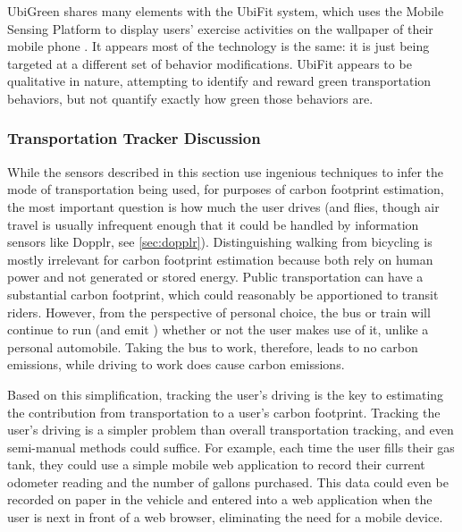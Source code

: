 UbiGreen shares many elements with the UbiFit system, which uses the Mobile Sensing Platform to display users' exercise activities on the wallpaper of their mobile phone \cite{Consolvo2008Flowers-or-robot}. It appears most of the technology is the same: it is just being targeted at a different set of behavior modifications. UbiFit appears to be qualitative in nature, attempting to identify and reward green transportation behaviors, but not quantify exactly how green those behaviors are.

\subsubsection{Transportation Tracker Discussion}

While the sensors described in this section use ingenious techniques to infer the mode of transportation being used, for purposes of carbon footprint estimation, the most important question is how much the user drives (and flies, though air travel is usually infrequent enough that it could be handled by information sensors like Dopplr, see \autoref{sec:dopplr}). Distinguishing walking from bicycling is mostly irrelevant for carbon footprint estimation because both rely on human power and not generated or stored energy. Public transportation can have a substantial carbon footprint, which could reasonably be apportioned to transit riders. However, from the perspective of personal choice, the bus or train will continue to run (and emit \COtwo) whether or not the user makes use of it, unlike a personal automobile. Taking the bus to work, therefore, leads to no carbon emissions, while driving to work does cause carbon emissions.

Based on this simplification, tracking the user's driving is the key to estimating the contribution from transportation to a user's carbon footprint. Tracking the user's driving is a simpler problem than overall transportation tracking, and even semi-manual methods could suffice. For example, each time the user fills their gas tank, they could use a simple mobile web application to record their current odometer reading and the number of gallons purchased. This data could even be recorded on paper in the vehicle and entered into a web application when the user is next in front of a web browser, eliminating the need for a mobile device. 

